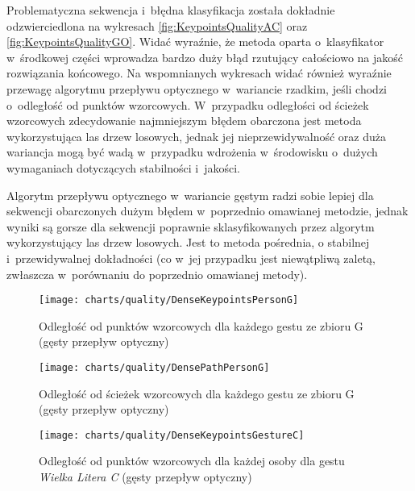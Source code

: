     Problematyczna sekwencja i~błędna klasyfikacja została dokładnie odzwierciedlona na wykresach \ref{fig:KeypointsQualityAC} oraz \ref{fig:KeypointsQualityGO}. Widać wyraźnie, że metoda oparta o~klasyfikator w~środkowej części wprowadza bardzo duży błąd rzutujący całościowo na jakość rozwiązania końcowego. Na wspomnianych wykresach widać również wyraźnie przewagę algorytmu przepływu optycznego w~wariancie rzadkim, jeśli chodzi o~odległość od punktów wzorcowych. W~przypadku odległości od ścieżek wzorcowych zdecydowanie najmniejszym błędem obarczona jest metoda wykorzystująca las drzew losowych, jednak jej nieprzewidywalność oraz duża wariancja mogą być wadą w~przypadku wdrożenia w~środowisku o~dużych wymaganiach dotyczących stabilności i~jakości.

    Algorytm przepływu optycznego w~wariancie gęstym radzi sobie lepiej dla sekwencji obarczonych dużym błędem w~poprzednio omawianej metodzie, jednak wyniki są gorsze dla sekwencji poprawnie sklasyfikowanych przez algorytm wykorzystujący las drzew losowych. Jest to metoda pośrednia, o stabilnej i~przewidywalnej dokładności (co w~jej przypadku jest niewątpliwą zaletą, zwłaszcza w~porównaniu do poprzednio omawianej metody).

    \newpage
      \begin{figure}[!ht]
        \centering
        \texttt{[image: charts/quality/DenseKeypointsPersonG]}
        \caption[Odległość od punktów wzorcowych dla każdego gestu (gęsty przepływ optyczny)]
                {Odległość od punktów wzorcowych dla każdego gestu ze zbioru G (gęsty przepływ optyczny)}
        \label{fig:DenseKeypointsPersonG}
      \end{figure}

      \begin{figure}[!ht]
        \centering
        \texttt{[image: charts/quality/DensePathPersonG]}
        \caption[Odległość od ścieżek wzorcowych dla każdego gestu (gęsty przepływ optyczny)]
                {Odległość od ścieżek wzorcowych dla każdego gestu ze zbioru G\\(gęsty przepływ optyczny)}
        \label{fig:DensePathPersonG}
      \end{figure}

    \newpage
      \begin{figure}[!ht]
        \centering
        \texttt{[image: charts/quality/DenseKeypointsGestureC]}
        \caption[Odległość od punktów wzorcowych dla każdej osoby dla gestu C (gęsty przepływ optyczny)]
                {Odległość od punktów wzorcowych dla każdej osoby dla gestu\\\textit{Wielka Litera C} (gęsty przepływ optyczny)}
        \label{fig:DenseKeypointsGestureC}
      \end{figure}

